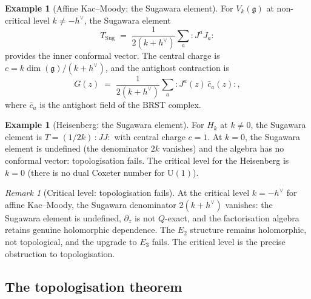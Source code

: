 \documentclass[11pt,reqno]{amsart}
\theoremstyle{definition}
\newtheorem{example}[theorem]{Example}
\theoremstyle{remark}
\newtheorem{remark}[theorem]{Remark}
\providecommand{\fg}{\mathfrak{g}}
\providecommand{\Etwo}{E_2}
\providecommand{\Ethree}{E_3}
\begin{document}
\begin{example}[Affine Kac--Moody: the Sugawara element]
\label{ex:e-sugawara}
For $V_k(\fg)$ at non-critical level $k \neq -h^\vee$, the
Sugawara element
\begin{equation}\label{eq:e-sugawara}
T_{\mathrm{Sug}}
\;=\; \frac{1}{2(k + h^\vee)}\sum_a {:}J^a J_a{:}
\end{equation}
provides the inner conformal vector. The central charge is
$c = k\dim(\fg)/(k + h^\vee)$, and the antighost contraction is
\begin{equation}\label{eq:e-antighost}
G(z) \;=\; \frac{1}{2(k + h^\vee)}\sum_a
{:}J^a(z)\,\bar{c}_a(z){:},
\end{equation}
where $\bar{c}_a$ is the antighost field of the BRST complex.
\end{example}

\begin{example}[Heisenberg: the Sugawara element]
\label{ex:e-heis-sugawara}
For $H_k$ at $k \neq 0$, the Sugawara element is
$T = (1/2k)\,{:}JJ{:}$ with central charge $c = 1$. At
$k = 0$, the Sugawara element is undefined (the denominator
$2k$ vanishes) and the algebra has no conformal vector:
topologisation fails. The critical level for the Heisenberg is
$k = 0$ (there is no dual Coxeter number for $\mathrm{U}(1)$).
\end{example}

\begin{remark}[Critical level: topologisation fails]
\label{rem:e-critical-level}
At the critical level $k = -h^\vee$ for affine Kac--Moody,
the Sugawara denominator $2(k + h^\vee)$ vanishes: the Sugawara
element is undefined, $\partial_z$ is not $Q$-exact, and the
factorisation algebra retains genuine holomorphic dependence.
The $\Etwo$ structure remains holomorphic, not topological,
and the upgrade to $\Ethree$ fails. The critical level is the
precise obstruction to topologisation.
\end{remark}

\subsection{The topologisation theorem}
\end{document}
